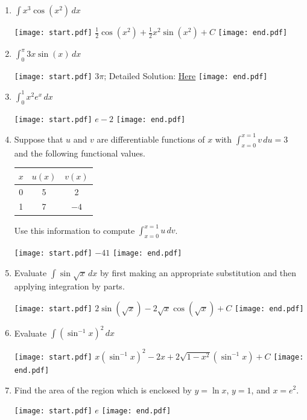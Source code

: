 \documentclass[12pt]{article}
\begin{document}
\begin{enumerate}
\item $\int x^3 \cos{(x^2)} \,dx$

\texttt{[image: start.pdf]}
{{$\frac{1}{2}\cos{(x^2)}+\frac{1}{2}x^2\sin{(x^2)}+C$}}
\texttt{[image: end.pdf]}


\item $\int_{0}^{\pi}3x\sin{(x)}\,dx$ 

\texttt{[image: start.pdf]}
{{$3\pi$; Detailed Solution: \textcolor{blue}{\href{http://www.math.drexel.edu/classes/Calculus/resources/Math122HW/Solutions/122_11_Parts_11.pdf}{Here}}}}
\texttt{[image: end.pdf]}


\item $\int_{0}^{1}x^2e^{x}\,dx$ 

\texttt{[image: start.pdf]}
{{$e-2$}}
\texttt{[image: end.pdf]}


\item Suppose that $u$ and $v$ are differentiable functions of $x$ with $\int_{x=0}^{x=1} v \,du = 3$ and the following functional values.\\
\begin{center}
\begin{tabular}{|c|c|c|}
\hline
$x$ & $u(x)$ & $v(x)$\\
\hline
0 & 5 & 2 \\
\hline
1 & 7 & $-4$\\
\hline
\end{tabular}
\end{center}
Use this information to compute $\int_{x=0}^{x=1} u \,dv$.

\texttt{[image: start.pdf]}
{{$-41$}}
\texttt{[image: end.pdf]}


\item Evaluate $\int \sin{\sqrt{x}} \,dx$ by first making an appropriate substitution and then applying integration by parts.

\texttt{[image: start.pdf]}
{{$2\sin{(\sqrt{x})}-2\sqrt{x}\cos{(\sqrt{x})}+C$}}
\texttt{[image: end.pdf]}


\item Evaluate $\int \left(\sin^{-1}x\right)^2 \,dx$

\texttt{[image: start.pdf]}
{{$x\left(\sin^{-1}x\right)^2-2x+2\sqrt{1-x^2}\left(\sin^{-1}x\right)+C$}}
\texttt{[image: end.pdf]}


\item Find the area of the region which is enclosed by $y=\ln{x}$, $y=1$, and $x=e^2$.

\texttt{[image: start.pdf]}
{{$e$}}
\texttt{[image: end.pdf]}



\end{enumerate}
\end{document}
